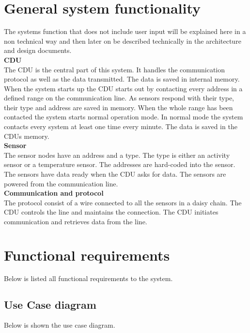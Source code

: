 \section{General system functionality}
The systems function that does not include user input will be explained here in a non technical way and then later on be described technically in the architecture and design documents.\\
\textbf{CDU}\\
The CDU is the central part of this system. It handles the communication protocol as well as the data transmitted. The data is saved in internal memory. When the system starts up the CDU starts out by contacting every address in a defined range on the communication line. As sensors respond with their type, their type and address are saved in memory. When the whole range has been contacted the system starts normal operation mode. In normal mode the system contacts every system at least one time every minute. The data is saved in the CDUs memory. \\
\textbf{Sensor}\\
The sensor nodes have an address and a type. The type is either an activity sensor or a temperature sensor. The addresses are hard-coded into the sensor. The sensors have data ready when the CDU asks for data. The sensors are powered from the communication line.\\
\textbf{Communication and protocol}\\
The protocol consist of a wire connected to all the sensors in a daisy chain. The CDU controls the line and maintains the connection. The CDU initiates communication and retrieves data from the line.\\

\section{Functional requirements}
Below is listed all functional requirements to the system.\\

\subsection{Use Case diagram}
Below is shown the use case diagram.\\
\centering\fbox{
	\begin{minipage}{5cm}
		\hfill\vspace{5cm}
	\end{minipage}
	}

